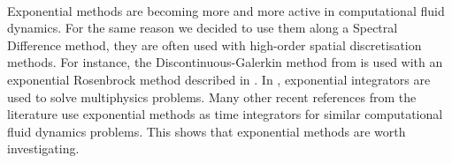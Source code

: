     \paragraph{}
    Exponential methods are becoming more and more active in computational fluid dynamics.
    For the same reason we decided to use them along a Spectral Difference method, they are often used with high-order spatial discretisation methods.
    For instance, the Discontinuous-Galerkin method from \cite{Li2013} is used with an exponential Rosenbrock method described in \cite{LiLuoWangEtAl2018, Li2020}.
    In \cite{NarayanamurthiSandu2021}, exponential integrators are used to solve multiphysics problems.
    Many other recent references from the literature use exponential methods as time integrators for similar computational fluid dynamics problems.
    This shows that exponential methods are worth investigating.
